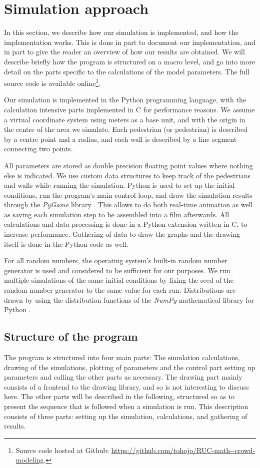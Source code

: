 \section{Simulation approach}
\label{sec:simulation}
In this section, we describe how our simulation is implemented, and how the 
implementation works. This is done in part to document our implementation, and 
in part to give the reader an overview of how our results are obtained.
We will describe briefly how the program is structured on a macro level, and 
go into more detail on the parts specific to the calculations of the model 
parameters. The full source code is available online\footnote{Source code 
hosted at Github: \url{https://github.com/tohojo/RUC-math--crowd-modeling}.}.


Our simulation is implemented in the Python programming language, with the 
calculation intensive parts implemented in C for performance reasons. We 
assume a virtual coordinate system using meters as a base unit, and with the 
origin in the centre of the area we simulate. Each pedestrian (or pedestrian) is 
described by a centre point and a radius, and each wall is described by a line 
segment connecting two points.

All parameters are stored as double precision floating point values where 
nothing else is indicated. We use custom data structures to keep track of the 
pedestrians and walls while running the simulation. Python is used to set up the 
initial conditions, run the program's main control loop, and draw the 
simulation results through the \emph{PyGame} library \cite{pygame}. This 
allows to do both real-time animation as well as saving each simulation step 
to be assembled into a film afterwards. All calculations and data processing 
is done in a Python extension written in C, to increase performance. Gathering 
of data to draw the graphs and the drawing itself is done in the Python code 
as well. 

For all random numbers, the operating system's built-in random number 
generator is used and considered to be sufficient for our purposes. We run 
multiple simulations of the same initial conditions by fixing the seed of the 
random number generator to the same value for each run. Distributions are 
drawn by using the distribution functions of the \emph{NumPy} mathematical 
library for Python \cite{numpy}.

\subsection{Structure of the program}
The program is structured into four main parts: The simulation calculations, 
drawing of the simulations, plotting of parameters and the control part 
setting up parameters and calling the other parts as necessary. The drawing 
part mainly consists of a frontend to the drawing library, and so is not 
interesting to discuss here. The other parts will be described in the 
following, structured so as to present the sequence that is followed when a 
simulation is run. This description consists of three parts: setting up the 
simulation, calculations, and gathering of results.

